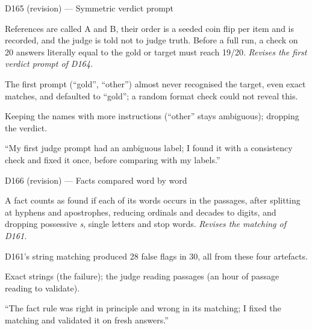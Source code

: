 \documentclass[11pt,a4paper]{report}
\begin{document}
\begin{decisionbox}{D165 (revision) --- Symmetric verdict prompt}
\begin{description}[nosep, leftmargin=0pt]
  \item[Decision.] References are called A and B, their order is a seeded coin flip per item and is recorded, and the judge is told not to judge truth. Before a full run, a check on 20 answers literally equal to the gold or target must reach 19/20. \emph{Revises the first verdict prompt of D164.}
  \item[Why.] The first prompt (``gold'', ``other'') almost never recognised the target, even exact matches, and defaulted to ``gold''; a random format check could not reveal this.
  \item[Alternatives.] Keeping the names with more instructions (``other'' stays ambiguous); dropping the verdict.
  \item[Interview line.] ``My first judge prompt had an ambiguous label; I found it with a consistency check and fixed it once, before comparing with my labels.''
\end{description}
\end{decisionbox}

\begin{decisionbox}{D166 (revision) --- Facts compared word by word}
\begin{description}[nosep, leftmargin=0pt]
  \item[Decision.] A fact counts as found if each of its words occurs in the passages, after splitting at hyphens and apostrophes, reducing ordinals and decades to digits, and dropping possessive \emph{s}, single letters and stop words. \emph{Revises the matching of D161.}
  \item[Why.] D161's string matching produced 28 false flags in 30, all from these four artefacts.
  \item[Alternatives.] Exact strings (the failure); the judge reading passages (an hour of passage reading to validate).
  \item[Interview line.] ``The fact rule was right in principle and wrong in its matching; I fixed the matching and validated it on fresh answers.''
\end{description}
\end{decisionbox}
\end{document}
